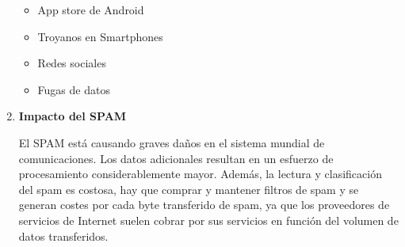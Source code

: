 \documentclass{article}
\begin{document}
\begin{enumerate}
\begin{itemize}
   \item App store de Android
   \item Troyanos en Smartphones
   \item Redes sociales
   \item Fugas de datos
\end{itemize}

\item \textbf{Impacto del SPAM}

El SPAM está causando graves daños en el sistema mundial de comunicaciones. Los datos adicionales resultan en un esfuerzo de procesamiento considerablemente mayor. Además, la lectura y clasificación del spam es costosa, hay que comprar y mantener filtros de spam y se generan costes por cada byte transferido de spam, ya que los proveedores de servicios de Internet suelen cobrar por sus servicios en función del volumen de datos transferidos.

\end{enumerate}
\end{document}
